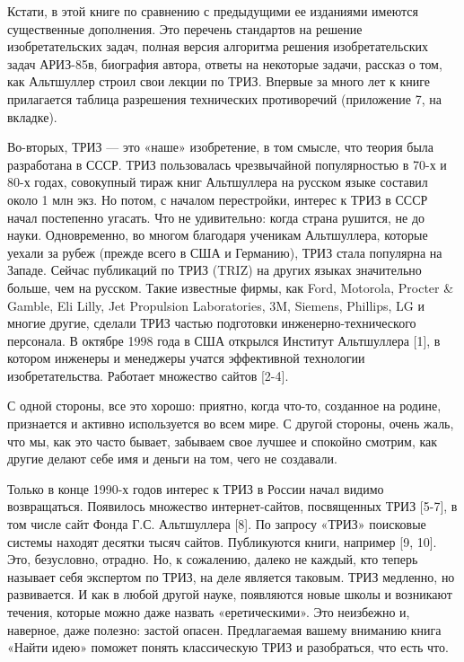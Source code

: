 Кстати,  в  этой  книге  по   сравнению  с  предыдущими  ее  изданиями
имеются   существенные   дополнения.   Это  перечень   стандартов   на
решение  изобретательских  задач,   полная  версия  алгоритма  решения
изобретательских задач АРИЗ-85в, биография автора, ответы на некоторые
задачи,  рассказ  о   том,  как  Альтшуллер  строил   свои  лекции  по
ТРИЗ.  Впервые за  много лет  к книге  прилагается таблица  разрешения
технических противоречий (приложение 7, на вкладке).

Во-вторых, ТРИЗ  — это  «наше» изобретение, в  том смысле,  что теория
была разработана в СССР.  ТРИЗ пользовалась чрезвычайной популярностью
в  70-х и  80-х годах,  совокупный тираж  книг Альтшуллера  на русском
языке  составил около  1 млн  экз.  Но потом,  с началом  перестройки,
интерес к  ТРИЗ в СССР  начал постепенно угасать. Что  не удивительно:
когда страна рушится,  не до науки. Одновременно,  во многом благодаря
ученикам Альтшуллера,  которые уехали за  рубеж (прежде всего в  США и
Германию), ТРИЗ стала  популярна на Западе. Сейчас  публикаций по ТРИЗ
(TRIZ)  на других  языках значительно  больше, чем  на русском.  Такие
известные фирмы, как Ford, Motorola, Procter \& Gamble, Eli Lilly, Jet
Propulsion Laboratories,  3M, Siemens,  Phillips, LG и  многие другие,
сделали  ТРИЗ частью  подготовки  инженерно-технического персонала.  В
октябре 1998 года  в США открылся Институт Альтшуллера  [1], в котором
инженеры и  менеджеры учатся эффективной  технологии изобретательства.
Работает множество сайтов [2-4].

С одной стороны,  все это хорошо: приятно, когда  что-то, созданное на
родине,  признается и  активно  используется во  всем  мире. С  другой
стороны,  очень жаль,  что мы,  как  это часто  бывает, забываем  свое
лучшее и спокойно смотрим, как другие делают себе имя и деньги на том,
чего не создавали.

Только  в конце  1990-х годов  интерес к  ТРИЗ в  России начал  видимо
возвращаться.  Появилось множество  интернет-сайтов, посвященных  ТРИЗ
[5-7], в том числе сайт Фонда  Г.С. Альтшуллера [8]. По запросу «ТРИЗ»
поисковые  системы находят  десятки тысяч  сайтов. Публикуются  книги,
например [9, 10]. Это, безусловно, отрадно. Но, к сожалению, далеко не
каждый, кто теперь  называет себя экспертом по ТРИЗ,  на деле является
таковым. ТРИЗ  медленно, но развивается.  И как в любой  другой науке,
появляются новые школы и возникают течения, которые можно даже назвать
«еретическими».  Это  неизбежно  и,  наверное,  даже  полезно:  застой
опасен. Предлагаемая вашему вниманию книга «Найти идею» поможет понять
классическую ТРИЗ и разобраться, что есть что.

